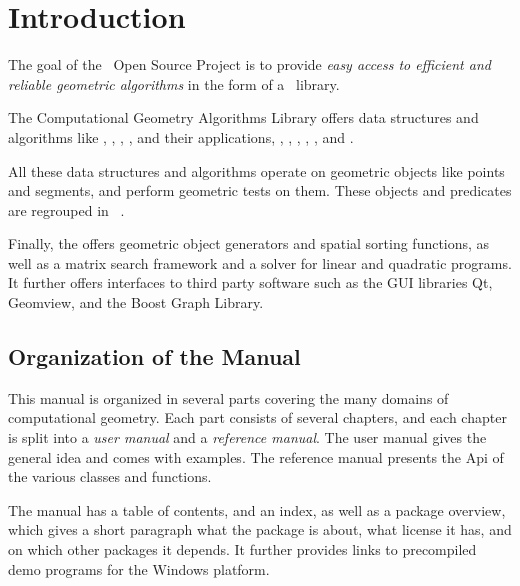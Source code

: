 
\chapter{Introduction}



The goal of the \cgal\ Open Source Project is to provide 
{\em easy access to efficient and reliable geometric algorithms}
in the form of a \CC\ library.

The Computational Geometry Algorithms Library offers data
structures and algorithms like 
,
,
,
,
 and their applications,
,
,
,
,
,
and .


All these data structures and algorithms operate on geometric objects
like points and segments, and perform geometric tests on them.
These objects and predicates are regrouped in \cgal\ .


Finally, the 
offers geometric object generators and spatial sorting functions,  
as well as a matrix search framework and a solver for linear and quadratic programs. 
It further offers interfaces to third party software such as the GUI libraries Qt, 
Geomview, and the Boost Graph Library.


\section{Organization of the Manual}

This manual is organized in several parts covering the many domains
of computational geometry. Each part consists of several chapters,
and each chapter is split into a {\em user manual}  and a {\em reference
manual}. The user manual gives the general idea and comes with examples.
The reference manual presents the {\sc Api} of the various classes
and functions.

The manual has a table of contents, and an index, as well as a package overview,
which gives a short paragraph what the package is about, what license
it has, and on which other packages it depends. It further provides
links to precompiled demo programs for the Windows platform.

